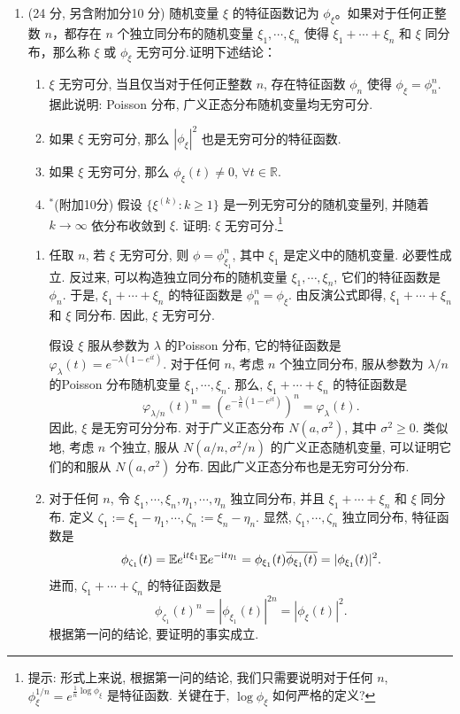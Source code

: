 \begin{enumerate}
\item[六、](24 分, 另含附加分10 分)
随机变量 $\xi$ 的特征函数记为 $\phi_{\xi}$。如果对于任何正整数 $n$，都存在 $n$ 个独立同分布的随机变量 $\xi_1,\cdots,\xi_n$ 使得 $\xi_1+\cdots+\xi_n$ 和 $\xi$ 同分布，那么称 $\xi$ 或 $\phi_{\xi}$ 无穷可分.证明下述结论：
\begin{enumerate}[label=(\arabic*)]
    \item $\xi$ 无穷可分, 当且仅当对于任何正整数 $n$, 存在特征函数 $\phi_{n}$ 使得 $\phi_{\xi}=\phi_{n}^{n}$. 据此说明: Poisson 分布, 广义正态分布随机变量均无穷可分.
\item 如果 $\xi$ 无穷可分, 那么 $|\phi_{\xi}|^{2}$ 也是无穷可分的特征函数.
\item 如果 $\xi$ 无穷可分, 那么 $\phi_{\xi}(t) \neq0$, $\forall t \in \mathbb{R}$.
\item $^*$(附加10分) 假设 $\{\xi^{(k)}: k \geq1\}$ 是一列无穷可分的随机变量列, 并随着 $k \to \infty$ 依分布收敛到 $\xi$. 证明: $\xi$ 无穷可分.\footnote{提示: 形式上来说, 根据第一问的结论, 我们只需要说明对于任何 $n$, $\phi_{\xi}^{1 / n}=e^{\frac{1}{n} \log \phi_{\xi}}$ 是特征函数. 关键在于, $\log \phi_{\xi}$ 如何严格的定义?
}
\end{enumerate}  
\begin{proofc}
    \begin{enumerate}[label=(\arabic*)]
\item 任取 $n$, 若 $\xi$ 无穷可分, 则 $\phi=\phi_{\xi_{1}}^{n}$, 其中 $\xi_{1}$ 是定义中的随机变量. 必要性成立. 
反过来, 可以构造独立同分布的随机变量 $\xi_{1}, \cdots, \xi_{n}$, 它们的特征函数是 $\phi_{n}$. 
于是, $\xi_{1}+\cdots+\xi_{n}$ 的特征函数是 $\phi_{n}^{n}=\phi_{\xi}$. 
由反演公式即得, $\xi_{1}+\cdots+\xi_{n}$ 和 $\xi$ 同分布. 因此, $\xi$ 无穷可分.

假设 $\xi$ 服从参数为 $\lambda$ 的Poisson 分布, 它的特征函数是 $\varphi_{\lambda}(t)=e^{-\lambda(1-e^{it})}$. 
对于任何 $n$, 考虑 $n$ 个独立同分布, 服从参数为 $\lambda / n$ 的Poisson 分布随机变量 $\xi_{1}, \cdots, \xi_{n}$. 
那么, $\xi_{1}+\cdots+\xi_{n}$ 的特征函数是
\[
\varphi_{\lambda / n}(t)^{n}=\left(e^{-\frac{\lambda}{n}\left(1-e^{i t}\right)}\right)^{n}=\varphi_{\lambda}(t) .
\]
因此, $\xi$ 是无穷可分分布. 对于广义正态分布 $N(a, \sigma^{2})$, 其中 $\sigma^{2} \geq0$. 
类似地, 考虑 $n$ 个独立, 服从 $N(a / n, \sigma^{2} / n)$ 的广义正态随机变量, 
可以证明它们的和服从 $N(a, \sigma^{2})$ 分布. 因此广义正态分布也是无穷可分分布.

\item 对于任何 $n$, 令 $\xi_{1}, \cdots, \xi_{n}, \eta_{1}, \cdots, \eta_{n}$ 独立同分布, 并且 $\xi_{1}+\cdots+\xi_{n}$ 和 $\xi$ 同分布. 定义 $\zeta_{1}:=\xi_{1}-\eta_{1}, \cdots, \zeta_{n}:=\xi_{n}-\eta_{n}$. 显然, $\zeta_{1}, \cdots, \zeta_{n}$ 独立同分布, 特征函数是
\[
\phi_{\zeta_{1}}(t)=\mathbb{E} e^{{\rm i} t \xi_{1}} \mathbb{E} e^{-{\rm i} t \eta_{1}}=\phi_{\xi_{1}}(t) \overline{\phi_{\xi_{1}}(t)}=|\phi_{\xi_{1}}(t)|^{2}.
\]
进而, $\zeta_{1}+\cdots+\zeta_{n}$ 的特征函数是
\[
\phi_{\zeta_{1}}(t)^{n}=|\phi_{\xi_{1}}(t)|^{2n}=|\phi_{\xi}(t)|^{2}.
\]
根据第一问的结论, 要证明的事实成立.


\end{enumerate}
\end{proofc}
\end{enumerate}
